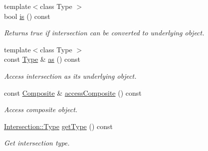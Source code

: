 \begin{DoxyCompactItemize}
$${\footnotesize template$<$class Type $>$ }\\bool \hyperlink{classlibrary_1_1math_1_1geom_1_1d3_1_1_intersection_a9e7c3d0568a6c9a29ba3503751166932}{is} () const
\begin{DoxyCompactList}\small\item\em Returns true if intersection can be converted to underlying object. \end{DoxyCompactList}\item 
{\footnotesize template$<$class Type $>$ }\\const \hyperlink{classlibrary_1_1math_1_1geom_1_1d3_1_1_intersection_a3465d607fd42380f350598e055271b05}{Type} \& \hyperlink{classlibrary_1_1math_1_1geom_1_1d3_1_1_intersection_a018842f95665de8a388f0b7cd48410a6}{as} () const
\begin{DoxyCompactList}\small\item\em Access intersection as its underlying object. \end{DoxyCompactList}\item 
const \hyperlink{classlibrary_1_1math_1_1geom_1_1d3_1_1objects_1_1_composite}{Composite} \& \hyperlink{classlibrary_1_1math_1_1geom_1_1d3_1_1_intersection_a41c84848c38a3e4d3acf432001501e05}{access\+Composite} () const
\begin{DoxyCompactList}\small\item\em Access composite object. \end{DoxyCompactList}\item 
\hyperlink{classlibrary_1_1math_1_1geom_1_1d3_1_1_intersection_a3465d607fd42380f350598e055271b05}{Intersection\+::\+Type} \hyperlink{classlibrary_1_1math_1_1geom_1_1d3_1_1_intersection_aead6925dc35a2f6aec30373ca1556600}{get\+Type} () const
\begin{DoxyCompactList}\small\item\em Get intersection type. \end{DoxyCompactList}\end{DoxyCompactItemize}
